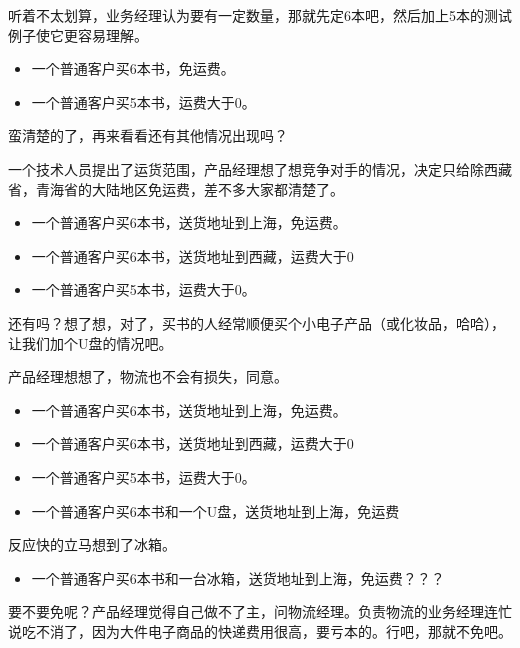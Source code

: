 听着不太划算，业务经理认为要有一定数量，那就先定6本吧，然后加上5本的测试例子使它更容易理解。

\begin{itemize}
\item 一个普通客户买6本书，免运费。

\item 一个普通客户买5本书，运费大于0。

\end{itemize}

蛮清楚的了，再来看看还有其他情况出现吗？

一个技术人员提出了运货范围，产品经理想了想竞争对手的情况，决定只给除西藏省，青海省的大陆地区免运费，差不多大家都清楚了。

\begin{itemize}
\item 一个普通客户买6本书，送货地址到上海，免运费。

\item 一个普通客户买6本书，送货地址到西藏，运费大于0

\item 一个普通客户买5本书，运费大于0。

\end{itemize}

还有吗？想了想，对了，买书的人经常顺便买个小电子产品（或化妆品，哈哈），让我们加个U盘的情况吧。

产品经理想想了，物流也不会有损失，同意。

\begin{itemize}
\item 一个普通客户买6本书，送货地址到上海，免运费。

\item 一个普通客户买6本书，送货地址到西藏，运费大于0

\item 一个普通客户买5本书，运费大于0。

\item 一个普通客户买6本书和一个U盘，送货地址到上海，免运费

\end{itemize}

反应快的立马想到了冰箱。

\begin{itemize}
\item 一个普通客户买6本书和一台冰箱，送货地址到上海，免运费？？？

\end{itemize}

要不要免呢？产品经理觉得自己做不了主，问物流经理。负责物流的业务经理连忙说吃不消了，因为大件电子商品的快递费用很高，要亏本的。行吧，那就不免吧。

